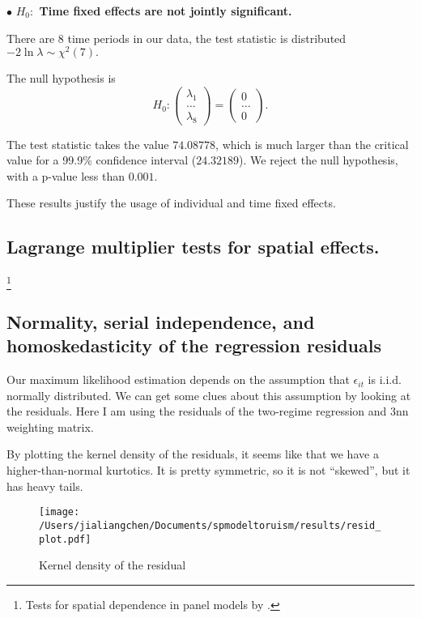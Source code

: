 \documentclass[11pt,a4paper]{amsart}
\theoremstyle{plain}
\theoremstyle{definition}
\begin{document}
$\bullet$ \textbf{$H_{0}:$ Time fixed effects are not jointly significant.} 
		
There are $8$ time periods in our data, the test statistic is distributed  $-2 \ln \lambda \sim \chi^{2}(7).$
		
The null hypothesis is 
\[	H_{0}: \begin{pmatrix}
		\lambda_{1} \\
		\dots \\
		\lambda_{8}
\end{pmatrix} = \begin{pmatrix}
		0 \\
		\dots \\
		0
\end{pmatrix}.	\]
		
The test statistic takes the value $74.08778$, which is much larger than the critical value for a 99.9\% confidence interval ($24.32189$). We reject the null hypothesis, with a p-value less than $0.001$.
		
These results justify the usage of individual and time fixed effects. 
		
\subsection{Lagrange multiplier tests for spatial effects.}\footnote{Tests for spatial dependence in panel models by \parencite{anselinSpatialPanelEconometrics2008}.}\hfill\par
		
\subsection{Normality, serial independence, and homoskedasticity of the regression residuals}

Our maximum likelihood estimation depends on the assumption that $\epsilon_{it}$ is i.i.d. normally distributed. We can get some clues about this assumption by looking at the residuals. Here I am using the residuals of the two-regime regression and 3nn weighting matrix. 

By plotting the kernel density of the residuals, it seems like that we have a higher-than-normal kurtotics. It is pretty symmetric, so it is not ``skewed'', but it has heavy tails.

\begin{figure}[hbt]
	{\centering \texttt{[image: /Users/jialiangchen/Documents/spmodeltoruism/results/resid\_plot.pdf]}}
	\caption{Kernel density of the residual}\label{F:kden_resid}
\end{figure}
\end{document}
